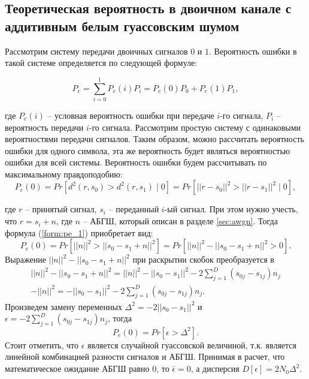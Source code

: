 \subsection{Теоретическая вероятность в двоичном канале с аддитивным белым гуассовским шумом}

Рассмотрим систему передачи двоичных сигналов $0$ и $1$. Вероятность ошибки в такой системе определяется по следующей формуле:

\begin{equation}
	P_e = \sum_{i=0}^{1}P_e(i)P_i = P_e(0)P_0 + P_e(1)P_1,
\end{equation}

где $P_e(i)$ -- условная вероятность ошибки при передаче $i$-го сигнала, $P_i$ -- вероятность передачи $i$-го сигнала. Рассмотрим простую систему с одинаковыми вероятностями передачи сигналов. Таким образом, можно рассчитать вероятность ошибки для одного символа, эта же вероятность будет являться вероятностью ошибки для всей системы. Вероятность ошибки будем рассчитывать по максимальному правдоподобию:
\begin{equation}
	\label{form:pe_1}
	P_e(0) = Pr[d^2(r,s_0) > d^2(r,s_1) \mid 0] = Pr[ || r - s_0||^2 > ||r - s_1||^2 \mid 0] ,
\end{equation}

где $r$ -- принятый сигнал, $s_i$ -- переданный $i$-ый сигнал. При этом нужно учесть, что $r = s_i + n$, где $n$ -- АБГШ, который описан в разделе \ref{sec:awgn}. Тогда формула (\ref{form:pe_1}) приобретает вид:
\begin{equation}
	P_e(0) = Pr[||n||^2 > ||s_0 - s_1 + n||^2] = Pr[||n||^2 - ||s_0 - s_1 + n||^2 > 0].
\end{equation}
Выражение $||n||^2 - ||s_0 - s_1 + n||^2$ при раскрытии скобок преобразуется в 
\begin{equation}
\begin{split}
	||n||^2 - ||s_0 - s_1 + n||^2 = ||n||^2 - ||s_0 - s_1||^2 - 2\sum_{j=1}^{D}(s_{0j} - s_{1j}) n_j\\ - ||n||^2 = 
	 - ||s_0 - s_1||^2 - 2\sum_{j=1}^{D}(s_{0j} - s_{1j}) n_j.
\end{split}
\end{equation}
Произведем замену переменных $\Delta^2 =-2||s_0 - s_1||^2$ и $\epsilon =  -2\sum_{j=1}^{D}(s_{0j} - s_{1j}) n_j$, тогда 
\begin{equation}
	P_e(0) = Pr[\epsilon > \Delta^2].
\end{equation}
Стоит отметить, что $\epsilon$ является случайной гуассовской величиной, т.к. является линейной комбинацией разности сигналов и АБГШ. Принимая в расчет, что математическое ожидание АБГШ равно $0$, то $\bar{\epsilon} = 0$, а дисперсия $D[\epsilon] = 2N_0\Delta^2$.

